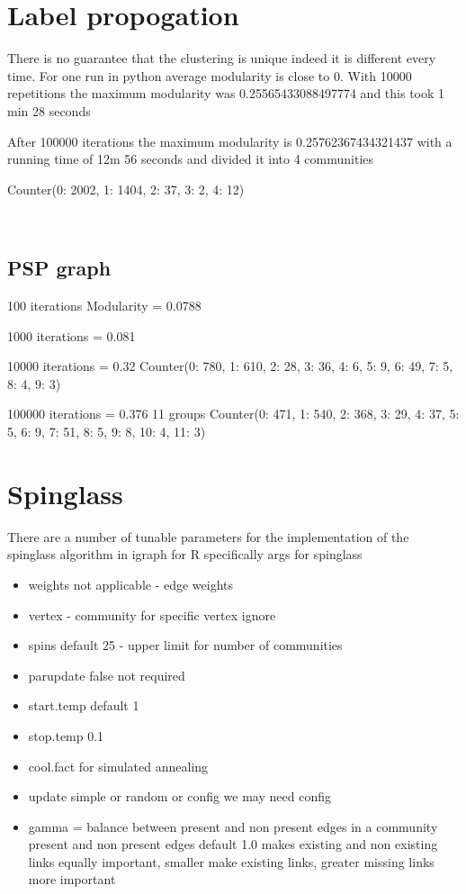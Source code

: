\section{Label propogation}
\label{sec:label propogation}

\cite{raghavan2007near}

There is no guarantee that the clustering is unique indeed it is different every time. For one run in python average modularity is close to 0. With 10000 repetitions the maximum modularity was 0.25565433088497774 and this took 1 min 28 seconds

After 100000 iterations the maximum modularity is 0.25762367434321437 with a running time of 12m 56 seconds and divided it into 4 communities

Counter(0: 2002, 1: 1404, 2: 37, 3: 2, 4: 12)


\
\subsection{PSP graph}
100 iterations Modularity = 0.0788

1000 iterations = 0.081

10000 iterations = 0.32
Counter({0: 780, 1: 610, 2: 28, 3: 36, 4: 6, 5: 9, 6: 49, 7: 5, 8: 4, 9: 3})

100000 iterations = 0.376 11 groups
Counter({0: 471,
         1: 540,
         2: 368,
         3: 29,
         4: 37,
         5: 5,
         6: 9,
         7: 51,
         8: 5,
         9: 8,
         10: 4,
         11: 3})
         



\section{Spinglass}
\label{sec: Spinglass description}
There are a number of tunable parameters for the implementation of the spinglass algorithm in igraph for R specifically
args for spinglass
\begin{itemize}
    \item{weights not applicable - edge weights}
    \item vertex - community for specific vertex ignore
    \item spins default 25 - upper limit for number of communities
    \item parupdate false not required
    \item start.temp default 1
    \item stop.temp 0.1
    \item cool.fact for simulated annealing
    \item update simple or random or config we may need config
    \item gamma = balance between present and non present edges in a community present and non present edges default 1.0 makes existing and non existing links equally important, smaller make existing links, greater missing links more important
\end{itemize}









